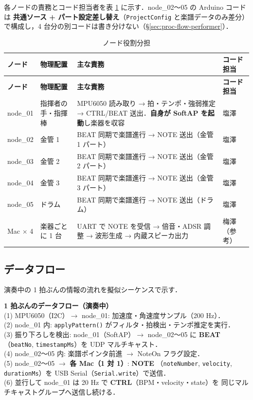 \documentclass[lualatex,book,paper=a4paper,jafontsize=11.5pt,jafontscale=1.05]{jlreq}
\begin{document}
各ノードの責務とコード担当者を表 \ref{tab:node-roles} に示す．node\_02〜05 の Arduino
コードは \textbf{共通ソース + パート設定差し替え}（\texttt{ProjectConfig} と楽譜データのみ差分）
で構成し，4 台分の別コードは書き分けない（\S\ref{sec:proc-flow-performer}）．

\begin{longtable}{l p{} p{} l}
\caption{ノード役割分担}\label{tab:node-roles}\\
\toprule
\textbf{ノード} & \textbf{物理配置} & \textbf{主な責務} & \textbf{コード担当} \\
\midrule
\endfirsthead
\toprule
\textbf{ノード} & \textbf{物理配置} & \textbf{主な責務} & \textbf{コード担当} \\
\midrule
\endhead
node\_01 & 指揮者の手・指揮棒 & MPU6050 読み取り → 拍・テンポ・強弱推定 → CTRL/BEAT 送出．\textbf{自身が SoftAP を起動}し楽器を収容 & 塩澤 \\
node\_02 & 金管 1             & BEAT 同期で楽譜進行 → NOTE 送出（金管 1 パート） & 塩澤 \\
node\_03 & 金管 2             & BEAT 同期で楽譜進行 → NOTE 送出（金管 2 パート） & 塩澤 \\
node\_04 & 金管 3             & BEAT 同期で楽譜進行 → NOTE 送出（金管 3 パート） & 塩澤 \\
node\_05 & ドラム             & BEAT 同期で楽譜進行 → NOTE 送出（ドラム） & 塩澤 \\
Mac $\times$ 4 & 楽器ごとに 1 台 & UART で NOTE を受信 → 倍音・ADSR 調整 → 波形生成 → 内蔵スピーカ出力 & 梅澤（参考） \\
\bottomrule
\end{longtable}

\subsection{データフロー}

演奏中の 1 拍ぶんの情報の流れを擬似シーケンスで示す．

\begin{notebox}
\textbf{1 拍ぶんのデータフロー（演奏中）}\\[2pt]
(1) MPU6050（I2C）$\to$ node\_01: 加速度・角速度サンプル（200 Hz）．\\
(2) node\_01 内: \texttt{applyPattern()} がフィルタ・拍検出・テンポ推定を実行．\\
(3) 振り下ろしを検出: node\_01（SoftAP）$\to$ node\_02〜05 に \textbf{BEAT}
   （\texttt{beatNo}, \texttt{timestampMs}）を UDP マルチキャスト．\\
(4) node\_02〜05 内: 楽譜ポインタ前進 $\to$ NoteOn フラグ設定．\\
(5) node\_02〜05 $\to$ \textbf{各 Mac（1 対 1）}: \textbf{NOTE}
   （\texttt{noteNumber}, \texttt{velocity}, \texttt{durationMs}）を
   USB Serial（\texttt{Serial.write}）で送信．\\
(6) 並行して node\_01 は 20 Hz で \textbf{CTRL}（BPM・velocity・state）を
   同じマルチキャストグループへ送信し続ける．
\end{notebox}
\end{document}
